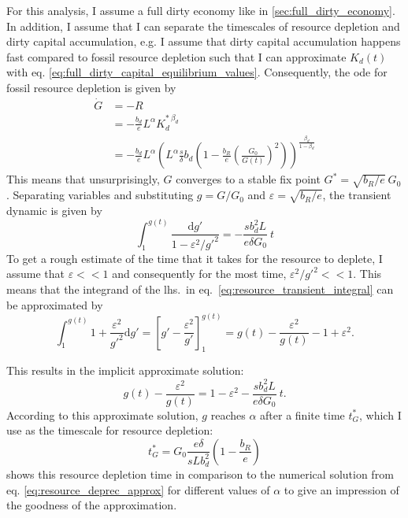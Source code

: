 For this analysis, I assume a full dirty economy like in \ref{sec:full_dirty_economy}. In addition, I assume that I can separate the timescales of resource depletion and dirty capital accumulation, e.g. I assume that dirty capital accumulation happens fast compared to fossil resource depletion such that I can approximate $K_d(t)$ with eq. \ref{eq:full_dirty_capital_equilibrium_values}. Consequently, the ode for fossil resource depletion is given by
\begin{align}
	\dot{G} &= -R \nonumber \\
        &= -\frac{b_d}{e}L^{\alpha}K_d^{*\ \beta_d} \nonumber \\
	&= - \frac{b_d}{e}L^{\alpha}\left(L^{\alpha} \frac{s}{\delta}b_d\left( 1-\frac{b_R}{e}\left( \frac{G_0}{G(t)} \right)^2 \right) \right)^{\frac{\beta_d}{1-\beta_d}}
	\label{eq:resource_deprec_approx}
\end{align}
This means that unsurprisingly, $G$ converges to a stable fix point $G^* = \sqrt{b_R/e}\ G_0$. Separating variables and substituting $g = G/G_0$ and $\varepsilon = \sqrt{b_R/e}$, the transient dynamic is given by
\begin{equation}
	\int_1^{g(t)} \frac{{\mathrm d} g'}{1 - \varepsilon^2/g'^2} = - \frac{s b_d^2 L}{e \delta G_0} \ t
	\label{eq:resource_transient_integral}
\end{equation}
To get a rough estimate of the time that it takes for the resource to deplete, I assume that $\varepsilon << 1$ and consequently for the most time, $\varepsilon^2/g'^2 << 1$.
This means that the integrand of the lhs.\ in eq.~\eqref{eq:resource_transient_integral} can be approximated by
\begin{equation}
	\int_1^{g(t)}1+\frac{\varepsilon^2}{g'^2} {\mathrm d}g' = \left[ g' - \frac{\varepsilon^2}{g'} \right]_1^{g(t)} = g(t) - \frac{\varepsilon^2}{g(t)} -1+\varepsilon^2.
	\label{eq:resource_transient_solution}
\end{equation}


This results in the implicit approximate solution:
\begin{equation}
  g(t) - \frac{\varepsilon^2}{g(t)} = 1 -\varepsilon^2 - \frac{s b_d^2 L}{e \delta G_0} \ t.
	\label{eq:resource_transient_solution2}
\end{equation}
According to this approximate solution, $g$ reaches $\alpha$ after a finite time $t^*_G$, which I use as the timescale for resource depletion:
\begin{equation}
	t^*_G = G_0\frac{e \delta}{s L b_d^2}\left( 1-\frac{b_R}{e} \right)
	\label{eq:resource_depletion_time}
\end{equation}
 shows this resource depletion time in comparison to the numerical solution from eq. \ref{eq:resource_deprec_approx} for different values of $\alpha$ to give an impression of the goodness of the approximation.

